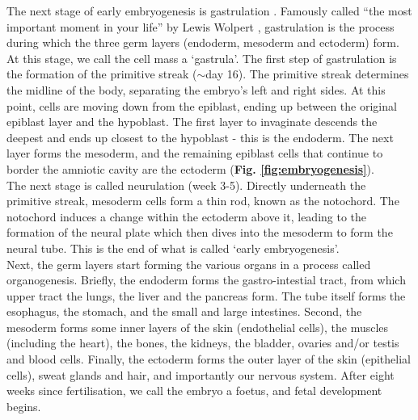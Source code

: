 The next stage of early embryogenesis is gastrulation \cite{sheng2015epiblast}.
Famously called “the most important moment in your life” by Lewis Wolpert \cite{wolpert2015interview}, gastrulation is the process during which the three germ layers (endoderm, mesoderm and ectoderm) form.
At this stage, we call the cell mass a `gastrula'.
The first step of gastrulation is the formation of the primitive streak ($\sim$day 16).
The primitive streak determines the midline of the body, separating the embryo's left and right sides.
At this point, cells are moving down from the epiblast, ending up between the original epiblast layer and the hypoblast.
The first layer to invaginate descends the deepest and ends up closest to the hypoblast - this is the endoderm.
The next layer forms the mesoderm, and the remaining epiblast cells that continue to border the amniotic cavity are the ectoderm (\textbf{Fig. \ref{fig:embryogenesis}}).\\

The next stage is called neurulation (week 3-5).
Directly underneath the primitive streak, mesoderm cells form a thin rod, known as the notochord.
The notochord induces a change within the ectoderm above it, leading to the formation of the neural plate which then dives into the mesoderm to form the neural tube.
This is the end of what is called `early embryogenesis'.\\

Next, the germ layers start forming the various organs in a process called organogenesis.
Briefly, the endoderm forms the gastro-intestial tract, from which upper tract the lungs, the liver and the pancreas form. 
The tube itself forms the esophagus, the stomach, and the small and large intestines.
Second, the mesoderm forms some inner layers of the skin (endothelial cells), the muscles (including the heart), the bones, the kidneys, the bladder, ovaries and/or testis and blood cells.
Finally, the ectoderm forms the outer layer of the skin (epithelial cells), sweat glands and hair, and importantly our nervous system.
After eight weeks since fertilisation, we call the embryo a foetus, and fetal development begins.



